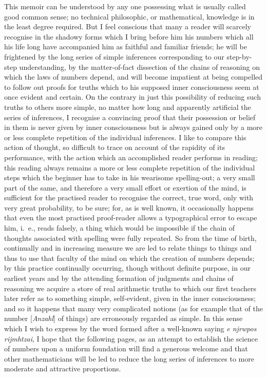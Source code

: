 \documentclass[oneside]{book}
\begin{document}
This memoir can be understood by any one possessing
what is usually called good common sense;
no technical philosophic, or mathematical, knowledge
is in the least degree required. But I feel conscious
that many a reader will scarcely recognise in the
shadowy forms which I bring before him his numbers
which all his life long have accompanied him as faithful
and familiar friends; he will be frightened by the
long series of simple inferences corresponding to our
step-by-step understanding, by the matter-of-fact dissection
of the chains of reasoning on which the laws
of numbers depend, and will become impatient at
being compelled to follow out proofs for truths which
to his supposed inner consciousness seem at once evident
and certain. On the contrary in just this possibility
of reducing such truths to others more simple,
no matter how long and apparently artificial the series
of inferences, I recognise a convincing proof that their
possession or belief in them is never given by inner
consciousness but is always gained only by a more or
less complete repetition of the individual inferences.
I like to compare this action of thought, so difficult
to trace on account of the rapidity of its performance,
with the action which an accomplished reader performs
in reading; this reading always remains a more
or less complete repetition of the individual steps
which the beginner has to take in his wearisome
spelling-out; a very small part of the same, and therefore
a very small effort or exertion of the mind, is sufficient
for the practised reader to recognise the correct,
true word, only with very great probability, to be
sure; for, as is well known, it occasionally happens
that even the most practised proof-reader allows a
typographical error to escape him, i.~e., reads falsely,
a thing which would be impossible if the chain of
thoughts associated with spelling were fully repeated.
So from the time of birth, continually and in increasing
measure we are led to relate things to things and
thus to use that faculty of the mind on which the
creation of numbers depends; by this practice continually
occurring, though without definite purpose,
in our earliest years and by the attending formation
of judgments and chains of reasoning we acquire a
store of real arithmetic truths to which our first teachers
later refer as to something simple, self-evident,
given in the inner consciousness; and so it happens
that many very complicated notions (as for example
that of the number [\textit{Anzahl}] of things) are erroneously
regarded as simple. In this sense which I wish
to express by the word formed after a well-known
saying \textit{\textgreek{\as e\ig{} \oR{} \asa njrwpos \as rijmht\ia zai}},
I hope that the following
pages, as an attempt to establish the science of
numbers upon a uniform foundation will find a generous
welcome and that other mathematicians will be
led to reduce the long series of inferences to more
moderate and attractive proportions.
\end{document}
